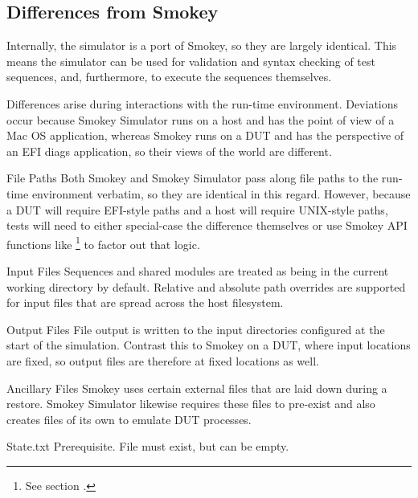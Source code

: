 \subsection{Differences from Smokey}

Internally, the simulator is a port of Smokey, so they are largely identical.
This means the simulator can be used for validation and syntax checking of test
sequences, and, furthermore, to execute the sequences themselves.

Differences arise during interactions with the run-time environment.
Deviations occur because Smokey Simulator runs on a host and has the point of
view of a Mac OS application, whereas Smokey runs on a DUT and has the
perspective of an EFI diags application, so their views of the world are
different.

\begin{Descriptive}

	\item[File Paths] Both Smokey and Smokey Simulator pass along file
	paths to the run-time environment verbatim, so they are identical in
	this regard.  However, because a DUT will require EFI-style paths and a
	host will require UNIX-style paths, tests will need to either
	special-case the difference themselves or use Smokey API functions like
	\footnote{See section
	.\label{fn:DiffApi}} to factor out that
	logic.

	\item[Input Files] Sequences and shared modules are treated as being in
	the current working directory by default.  Relative and absolute path
	overrides are supported for input files that are spread across the host
	filesystem.

	\item[Output Files] File output is written to the input directories
	configured at the start of the simulation. Contrast this to Smokey on a
	DUT, where input locations are fixed, so output files are therefore at
	fixed locations as well.

	\item[Ancillary Files] Smokey uses certain external files that are laid
	down during a restore.  Smokey Simulator likewise requires these files
	to pre-exist and also creates files of its own to emulate DUT
	processes.

	\begin{Descriptive}

		\item[State.txt] Prerequisite.  File must exist, but can be
		empty.


\end{Descriptive}
\end{Descriptive}
